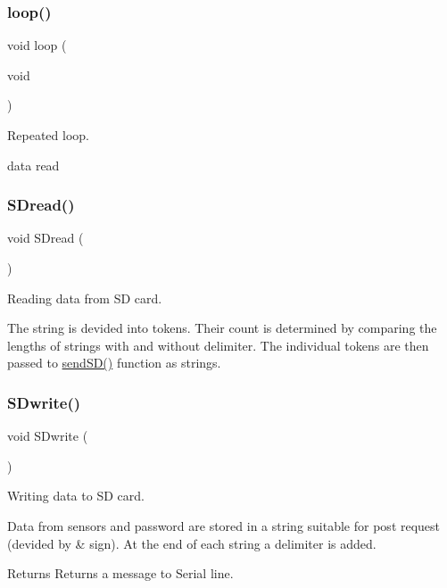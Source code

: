 \subsubsection{\texorpdfstring{loop()}{loop()}}
{\footnotesize\ttfamily void loop (\begin{DoxyParamCaption}\item[{void}]{ }\end{DoxyParamCaption})}



Repeated loop. 

data read\mbox{\label{_w_s_8ino_ae25c95c757003a1f2daacee7dae07105}} 
\subsubsection{\texorpdfstring{S\+Dread()}{SDread()}}
{\footnotesize\ttfamily void S\+Dread (\begin{DoxyParamCaption}{ }\end{DoxyParamCaption})}



Reading data from SD card. 

The string is devided into tokens. Their count is determined by comparing the lengths of strings with and without delimiter. The individual tokens are then passed to \hyperlink{_w_s_8ino_acca4eb89d9cb2ffb1d5d9fa19d429f9c}{send\+S\+D()} function as strings. \mbox{\label{_w_s_8ino_a5abc7cb0136096487b90a0a7001f1da6}} 
\subsubsection{\texorpdfstring{S\+Dwrite()}{SDwrite()}}
{\footnotesize\ttfamily void S\+Dwrite (\begin{DoxyParamCaption}{ }\end{DoxyParamCaption})}



Writing data to SD card. 

Data from sensors and password are stored in a string suitable for post request (devided by \& sign). At the end of each string a delimiter is added. \begin{DoxyReturn}{Returns}
Returns a message to Serial line. 
\end{DoxyReturn}
\mbox{\label{_w_s_8ino_aa9f1e5f04588dc7c432816e2faac1c2a}} 
